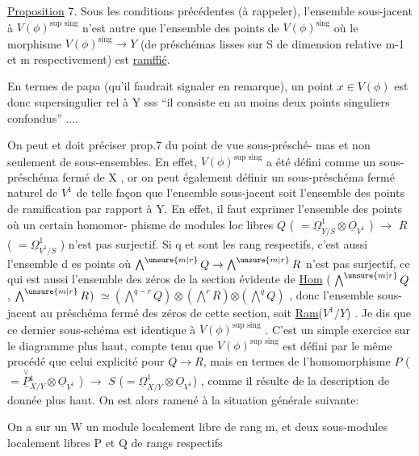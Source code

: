 
\uline{Proposition} 7. Sous les conditions précédentes (à rappeler), l'ensemble
sous-jacent à $V(\phi)^{\text{sup sing}}$ n'est autre que l'ensemble des points de
$V(\phi)^{\text{sing}}$  où le morphisme $V(\phi)^{\text{sing}}\longrightarrow Y$ (de préschémas lisses
sur S de dimension relative m-1 et m respectivement) est \uline{ramffié}.

En termes de papa (qu'il faudrait signaler en remarque), un point
$x \in V(\phi)$ est donc supersingulier rel à Y sss ``il consiste en au
moins deux points singuliers confondus'' ....

On peut et doit préciser prop.7 du point de vue   sous-présché-%
mas et non seulement de sous-ensembles. En effet, $V(\phi)^{\text{sup sing}}$ a été
défini comme un sous-préschéma fermé de X , or on peut également définir
un sous-préschéma fermé naturel de $V^1$ de telle façon que l'ensemble
sous-jacent soit l'ensemble des points de ramification par rapport à Y.
En effet, il faut exprimer l'ensemble des points où un certain homomor-%
phisme de modules loc libres $Q$ ( $=\underline{\Omega}^1_{Y/S}\otimes\underline{O}_{V^1}$ ) $\longrightarrow$ $R$ ( $=\underline{\Omega}^1_{V^1/S}$ )
n'est pas surjectif. Si q et  sont les rang respectifs, c'est aussi
l'ensemble d es points où $\bigwedge^{\unsure{m|r}} Q \rightarrow \bigwedge^{\unsure{m|r}} R$ n'est pas surjectif, ce qui est
aussi l'ensemble des zéros de la section évidente de \uline{Hom} ( $\bigwedge^{\unsure{m|r}} Q$ , $\bigwedge^{\unsure{m|r}} R$)
$\simeq (\bigwedge^{q-r} Q)\otimes(\bigwedge^{r} R)$$\otimes(\bigwedge^{q} Q)$\hand{$^{\vee}$} , donc l'ensemble sous-jacent au préschéma
fermé des zéros de cette section, soit \uline{Ram}($V^1/Y$) . Je dis que ce dernier
sous-schéma est identique à $V(\phi)^{\text{sup sing}}$ . C'est un simple exercice
sur le diagramme plus haut, compte tenu que $V(\phi)^{\text{sup sing}}$ est défini
par le même procédé que celui explicité pour $Q\longrightarrow R$, mais en termes de
l'homomorphisme $P$ ( $= \overset{\vee}{\underline{P}}{}^1_{X/Y}\otimes\underline{O}_{V^1}$ ) $\longrightarrow$ $S$ ($=\underline{\Omega}^1_{X/Y}\otimes\underline{O}_{V^1}$) , comme
il résulte de la description de \hand{$\mu$} donnée plus haut. On est alors
ramené à la situation générale suivante:

On a sur un   W un module localement libre  de rang m,
et deux sous-modules localement libres P et Q de rangs respectifs

